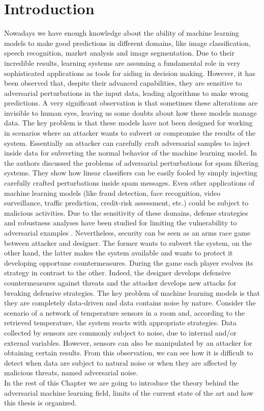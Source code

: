 \chapter{Introduction}
Nowadays we have enough knowledge about the ability of machine learning models to make good predictions in different domains, like image classification, speech recognition, market analysis and image segmentation. Due to their incredible results, learning systems are assuming a fundamental role in very sophisticated applications as tools for aiding in decision making.
However, it has been observed that, despite their advanced capabilities, they are sensitive to adversarial perturbations in the input data, leading  algorithms to make wrong predictions. A very significant observation is that sometimes these alterations are invisible to human eyes, leaving us some doubts about how  these models manage data. The key problem is that these models have not been designed for working in scenarios where an attacker wants to subvert or compromise the results of the system.
Essentially an attacker can carefully craft adversarial samples to inject inside data for subverting the normal behavior of the machine learning model. In \cite{spamfilter,spamfilter2} the authors discussed the problems of adversarial perturbations for spam filtering systems. They show how linear classifiers can be easily fooled by simply injecting carefully crafted perturbations inside spam messages. Even other applications of machine learning models (like fraud detection, face recognition,  video surveillance, traffic prediction, credit-risk assessment, etc.) could be subject to malicious activities. Due to the sensitivity of these domains, defense strategies and robustness analyses have been studied for limiting the vulnerability to adversarial examples \cite{obfuscategradient,wildpatterns,adversarialexamples,distanceDefence,certifiedDefenses}. Nevertheless, security can be seen as an arms race game between attacker and designer. The former wants to subvert the system, on the other hand, the latter makes the system available and wants to protect it developing opportune countermeasures. During the game each player evolves its strategy in contrast to the other. Indeed, the designer develops defensive countermeasures against threats and the attacker develops new attacks for breaking defensive strategies.
The key problem of machine learning models is that they are completely data-driven and data contains noise by nature. Consider the scenario of a network of temperature sensors in a room and, according to the retrieved temperature, the system reacts with appropriate strategies. Data collected by sensors are commonly subject to noise, due to internal and/or external variables. However, sensors can also be manipulated by an attacker for obtaining certain results. From this observation, we can see how it is difficult to detect when data are subject to natural noise or when they are affected by malicious threats, named adversarial noise.\\
In the rest of this Chapter we are going to introduce the theory behind the adversarial machine learning field, limits of the current state of the art and how this thesis is organized.
\newpage


